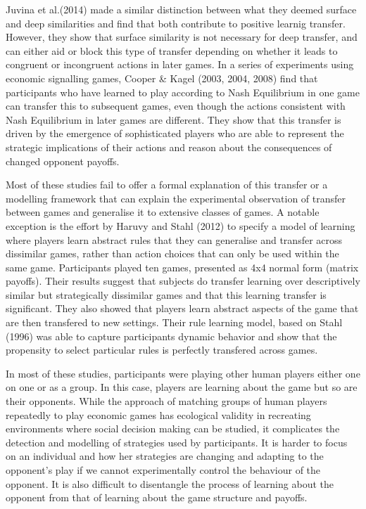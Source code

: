 \documentclass[12pt]{article}         %
\begin{document}
Juvina et al.(2014)  made a similar distinction between what they deemed surface and deep similarities and find that both contribute to positive learnig transfer. However, they show that surface similarity is not necessary for deep transfer, and can either aid or block this type of transfer depending on whether it leads to congruent or incongruent actions in later games. In a series of experiments using economic signalling games, Cooper & Kagel (2003, 2004, 2008) find that participants who have learned to play according to Nash Equilibrium in one game can transfer this to subsequent games, even though the actions consistent with Nash Equilibrium in later games are different.  They show that this transfer is driven by the emergence of sophisticated players who are able to represent the strategic implications of their actions and reason about the consequences of changed opponent payoffs.  

Most of these studies fail to offer a formal explanation of this transfer or a modelling framework that can explain the experimental observation of transfer between games and generalise it to extensive classes of games. A notable exception is the effort by Haruvy and Stahl (2012) to specify a model of learning where players learn abstract rules that they can generalise and transfer across dissimilar games, rather than action choices that can only be used within the same game. Participants played ten games, presented as 4x4 normal form (matrix payoffs). Their results suggest that subjects do transfer learning over descriptively similar but strategically dissimilar games and that this learning transfer is significant. They also showed that players learn abstract aspects of the game that are then transfered to new settings. Their rule learning model, based on Stahl (1996) was able to capture participants dynamic behavior and show that the propensity to select particular rules is perfectly transfered across games.  
 

In most of these studies, participants were playing other human players either one on one or as a group. In this case, players are learning about the game but so are their opponents. While the approach of matching groups of human players repeatedly to play economic games has ecological validity in recreating environments where social decision making can be studied, it complicates the detection and modelling of strategies used by participants. It is harder to focus on an individual and how her strategies are changing and adapting to the opponent's play if we cannot experimentally control the behaviour of the opponent. It is also difficult to disentangle the process of learning about the opponent from that of learning about the game structure and payoffs.  
\end{document}
